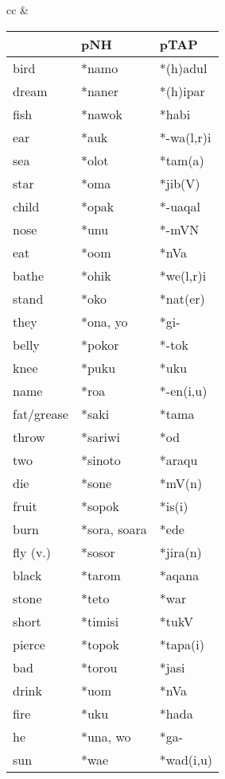 \begin{table}
\begin{tabularx}{\textwidth}{cc}
&

\begin{tabular}{lll} 
 	& \rm  \textbf{pNH\ilt{proto-North-Halmahera}}	&  \rm \textbf{pTAP\ilt{proto-Timor Alor Pantar}}\\
    \midrule
bird	&  *namo	&  *(h)adul\\
dream	&  *naner{\ddag}	&  *(h)ipar\\
fish	&  *nawok	&  *habi\\
ear	&  *{\ng}auk	&  *-wa(l,r)i\\
sea	&  *{\ng}olot	&  *tam(a)\\
star	&  *{\ng}oma	&  *jib(V)\\
child	&  *{\ng}opak	&  *-uaqal\footnotemark{}\\
nose	&  *{\ng}unu{\ng}	&  *-mVN\\
eat	&  *o{\dDOT}om	&  *nVa\\
bathe	&  *ohik{\ddag}	&  *we(l,r)i\\
stand	&  *oko	&  *nat(er)\\
they	&  *ona, yo	&  *gi- {\ddag}\\
belly	&  *pokor	&  *-tok {\ddag}\\
knee	&  *puku	&  *uku {\ddag}\\
name	&  *ro{\ng}a	&  *-en(i,u) {\ddag}\\
fat/grease	&  *saki	&  *tama {\ddag}\\
throw	&  *sariwi	&  *od {\ddag}\\
two	&  *sinoto	&  *araqu {\ddag}\\
die 	&  *sone{\ng}	&  *mV(n)\\
fruit	&  *sopok	&  *is(i) {\ddag}\\
burn	&  *sora, so{\ng}ara	&  *ede {\ddag}\\
fly (v.)	&  *sosor	&  *jira(n) {\ddag}\\
black	&  *tarom	&  *aqana {\ddag}\\
stone	&  *teto	&  *war\\
short	&  *timisi	&  *tukV {\ddag}\\
{\lightgreycell}pierce	& {\lightgreycell} *topok	& {\lightgreycell} *tapa(i)\\
bad	&  *torou	&  *jasi {\ddag}\\
drink	&  *u{\dDOT}om	&  *nVa\\
fire	&  *uku	&  *hada\\
he	&  *una, wo	&  *ga- {\ddag}\\
sun	&  *wa{\ng}e	&  *wad(i,u)\\ 
\end{tabular}
\\
\lspbottomrule
\end{tabularx}
\end{table}

